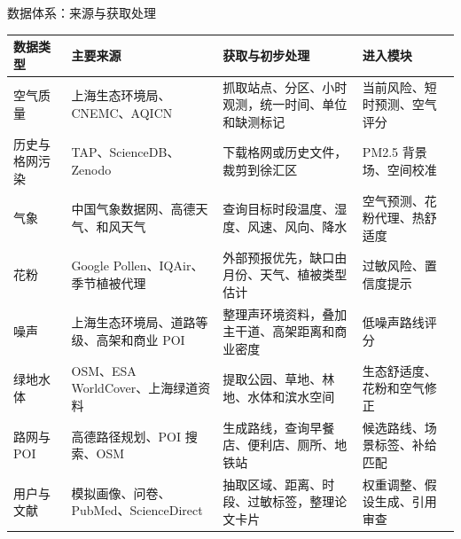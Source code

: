 \documentclass[xcolor=table,dvipsnames,svgnames,aspectratio=169]{ctexbeamer}
\begin{document}
\begin{frame}{数据体系：来源与获取处理}
  \scriptsize
  \renewcommand{\arraystretch}{0.82}
  \begin{tabularx}{\textwidth}{p{}p{}p{}Y}
    \toprule
    数据类型 & 主要来源 & 获取与初步处理 & 进入模块 \\
    \midrule
    空气质量 & 上海生态环境局、CNEMC、AQICN & 抓取站点、分区、小时观测，统一时间、单位和缺测标记 & 当前风险、短时预测、空气评分 \\
    历史与格网污染 & TAP、ScienceDB、Zenodo & 下载格网或历史文件，裁剪到徐汇区 & PM2.5 背景场、空间校准 \\
    气象 & 中国气象数据网、高德天气、和风天气 & 查询目标时段温度、湿度、风速、风向、降水 & 空气预测、花粉代理、热舒适度 \\
    花粉 & Google Pollen、IQAir、季节植被代理 & 外部预报优先，缺口由月份、天气、植被类型估计 & 过敏风险、置信度提示 \\
    噪声 & 上海生态环境局、道路等级、高架和商业 POI & 整理声环境资料，叠加主干道、高架距离和商业密度 & 低噪声路线评分 \\
    绿地水体 & OSM、ESA WorldCover、上海绿道资料 & 提取公园、草地、林地、水体和滨水空间 & 生态舒适度、花粉和空气修正 \\
    路网与 POI & 高德路径规划、POI 搜索、OSM & 生成路线，查询早餐店、便利店、厕所、地铁站 & 候选路线、场景标签、补给匹配 \\
    用户与文献 & 模拟画像、问卷、PubMed、ScienceDirect & 抽取区域、距离、时段、过敏标签，整理论文卡片 & 权重调整、假设生成、引用审查 \\
    \bottomrule
  \end{tabularx}
\end{frame}
\end{document}
